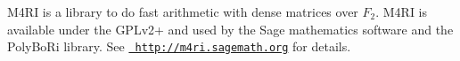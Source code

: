 M4\+RI is a library to do fast arithmetic with dense matrices over $F_2$. M4\+RI is available under the G\+P\+Lv2+ and used by the Sage mathematics software and the Poly\+Bo\+Ri library. See \href{http://m4ri.sagemath.org}{\texttt{ http\+://m4ri.\+sagemath.\+org}} for details. 